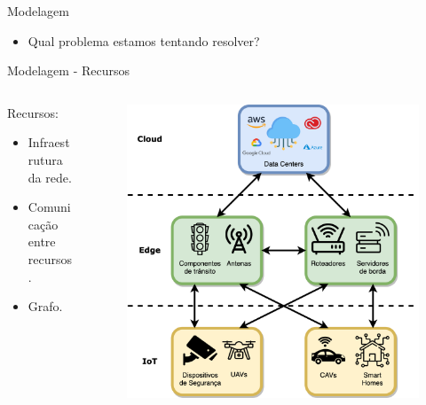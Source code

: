 \begin{frame}{Modelagem}
    \begin{itemize}
        \item Qual problema estamos tentando resolver?
    \end{itemize}
\end{frame}

\begin{frame}{Modelagem - Recursos}
    \begin{columns}[T]
        \begin{column}{.5\textwidth}
            Recursos:
            \begin{itemize}
                \item Infraestrutura da rede.
                \item Comunicação entre recursos.
                \item Grafo.
            \end{itemize}
        \end{column}

        \begin{column}{.5\textwidth}
            \begin{figure}
                \centering
                \includegraphics[width=\textwidth]{Figuras/TCC Edge Cloud IoT.png}
            \end{figure}
        \end{column}
    \end{columns}
\end{frame}

